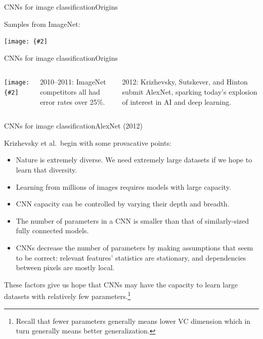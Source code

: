 \documentclass{beamer}
\newcommand{\myfig}[3]{\centerline{\texttt{[image: \{\#2]}}}
\begin{document}
\begin{frame}{CNNs for image classification}{Origins}

  Samples from ImageNet:

  \medskip

  \myfig{2.8in}{image-net}{\url{http://image-net.org/explore}}
  
\end{frame}


\begin{frame}{CNNs for image classification}{Origins}

  \begin{columns}

    \column{2.3in}

    \myfig{2.1in}{quartz-imagenet}{\begin{minipage}{2.3in} \url{https://qz.com/1034972/the-data-that-\\changed-the-direction-of-ai-research-\\and-possibly-the-world/} \end{minipage}}

    \column{2.2in}
    
    2010--2011: ImageNet competitors all had error rates over 25\%.

    \medskip

    2012: Krizhevsky, Sutskever, and Hinton submit
    \alert{AlexNet},
    sparking today's explosion of interest in AI and deep learning.

  \end{columns}
  
\end{frame}


\begin{frame}{CNNs for image classification}{AlexNet (2012)}

  Krizhevsky et al.\ begin with some provacative points:
  \begin{itemize}
    \item Nature is extremely diverse. We need \alert{extremely large
      datasets} if we hope to learn that diversity.
    \item Learning from millions of images requires \alert{models with
      large capacity}.
    \item CNN capacity can be controlled by varying their depth and breadth.
    \item The number of parameters in a CNN is smaller than that of
      similarly-sized fully connected models.
    \item CNNs decrease the number of parameters by making assumptions
      that seem to be correct: relevant features' statistics are
      stationary, and dependencies between pixels are mostly local.
  \end{itemize}

  These factors give us hope that CNNs may have the capacity to learn
  large datasets with relatively few parameters.\footnote{Recall that
    fewer parameters generally means lower VC dimension which in turn
    generally means better generalization.}

\end{frame}
\end{document}
